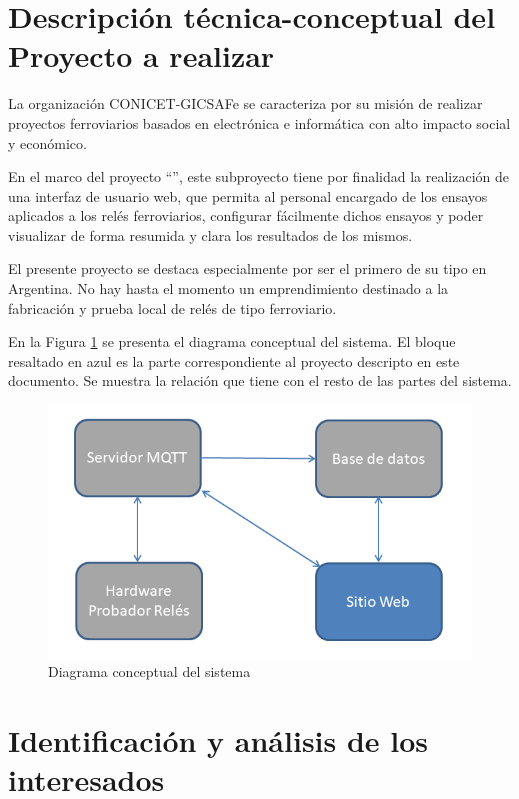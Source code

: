 \documentclass[11pt]{charter}
\begin{document}
\section{Descripción técnica-conceptual del Proyecto a realizar}
\label{sec:descripcion}

La organización CONICET-GICSAFe se caracteriza por su misión de realizar proyectos ferroviarios basados en electrónica e informática con alto impacto social y económico.

En el marco del proyecto ``\ttitle'', este subproyecto tiene por finalidad la realización de una interfaz de usuario web, que permita al personal encargado de los ensayos aplicados a los relés ferroviarios, configurar fácilmente dichos ensayos y poder visualizar de forma resumida y clara los resultados de los mismos.

El presente proyecto se destaca  especialmente por ser el primero de su tipo en Argentina. No hay hasta el momento un emprendimiento destinado a la fabricación y prueba local de relés de tipo ferroviario.

En la Figura \ref{fig:diagBloques} se presenta el diagrama conceptual del sistema. El bloque resaltado en azul es la parte correspondiente al proyecto descripto en este documento. Se muestra la relación que tiene con el resto de las partes del sistema.

\vspace{25px}

\begin{figure}[htpb]
\centering 
\includegraphics[width=.7\textwidth]{./Figuras/diagramaConceptual.png}
\caption{Diagrama conceptual del sistema}
\label{fig:diagBloques}
\end{figure}

\vspace{25px}

\newpage

\section{Identificación y análisis de los interesados}
\label{sec:interesados}
\end{document}
